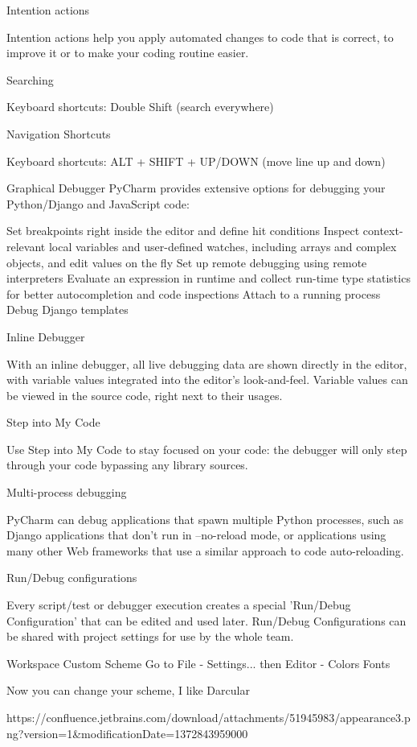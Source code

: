 Intention actions

Intention actions help you apply automated changes to code that is correct, to improve it or to make your coding routine easier.

Searching

Keyboard shortcuts: Double Shift (search everywhere)

Navigation
Shortcuts

Keyboard shortcuts: ALT + SHIFT + UP/DOWN (move line up and down)

Graphical Debugger
PyCharm provides extensive options for debugging your Python/Django and JavaScript code:

Set breakpoints right inside the editor and define hit conditions
Inspect context-relevant local variables and user-defined watches, including arrays and complex objects, and edit values on the fly
Set up remote debugging using remote interpreters
Evaluate an expression in runtime and collect run-time type statistics for better autocompletion and code inspections
Attach to a running process
Debug Django templates


Inline Debugger

With an inline debugger, all live debugging data are shown directly in the editor, with variable values integrated into the editor's look-and-feel. Variable values can be viewed in the source code, right next to their usages.

Step into My Code

Use Step into My Code to stay focused on your code: the debugger will only step through your code bypassing any library sources.

Multi-process debugging

PyCharm can debug applications that spawn multiple Python processes, such as Django applications that don't run in --no-reload mode, or applications using many other Web frameworks that use a similar approach to code auto-reloading.

Run/Debug configurations

Every script/test or debugger execution creates a special 'Run/Debug Configuration' that can be edited and used later. Run/Debug Configurations can be shared with project settings for use by the whole team.

Workspace
Custom Scheme
Go to File - Settings... then Editor - Colors Fonts

Now you can change your scheme, I like Darcular

https://confluence.jetbrains.com/download/attachments/51945983/appearance3.png?version=1&modificationDate=1372843959000

